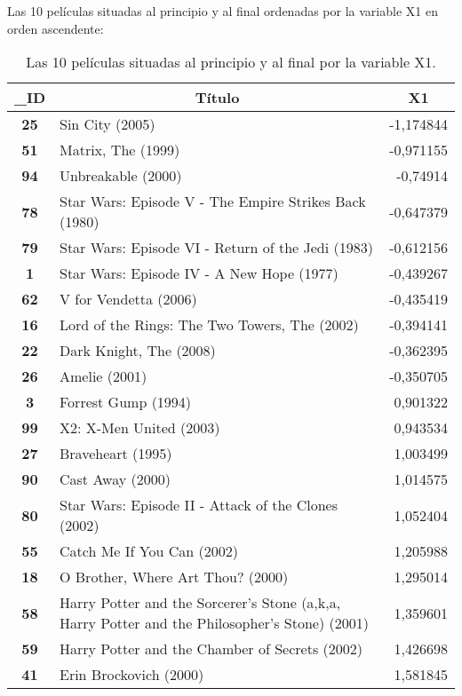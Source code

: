 \documentclass{uimppracticas}
\begin{document}
Las 10 películas situadas al principio y al final ordenadas por la variable X1 en orden ascendente:

\begin{table}[h]
	\centering
	\begin{tabular}{|c|l|r|}
		\hline
		\textbf{\_ID} & \multicolumn{1}{c|}{\textbf{Título}}                  & \multicolumn{1}{c|}{\textbf{X1}} \\ \hline
		\textbf{25} & Sin City (2005)         & -1,174844 \\ \hline
		\textbf{51} & Matrix, The (1999)      & -0,971155 \\ \hline
		\textbf{94} & Unbreakable (2000)      & -0,74914  \\ \hline
		\textbf{78}   & Star Wars: Episode V - The Empire Strikes Back (1980) & -0,647379                        \\ \hline
		\textbf{79}   & Star Wars: Episode VI - Return of the Jedi (1983)     & -0,612156                        \\ \hline
		\textbf{1}    & Star Wars: Episode IV - A New Hope (1977)             & -0,439267                        \\ \hline
		\textbf{62} & V for Vendetta (2006)   & -0,435419 \\ \hline
		\textbf{16}   & Lord of the Rings: The Two Towers, The (2002)         & -0,394141                        \\ \hline
		\textbf{22} & Dark Knight, The (2008) & -0,362395 \\ \hline
		\textbf{26} & Amelie (2001)           & -0,350705 \\ \hline
		\hline
		\textbf{3}  & Forrest Gump (1994)                                 & 0,901322 \\ \hline
		\textbf{99} & X2: X-Men United (2003)                             & 0,943534 \\ \hline
		\textbf{27} & Braveheart (1995)                                   & 1,003499 \\ \hline
		\textbf{90} & Cast Away (2000)                                    & 1,014575 \\ \hline
		\textbf{80} & Star Wars: Episode II - Attack of the Clones (2002) & 1,052404 \\ \hline
		\textbf{55} & Catch Me If You Can (2002)                          & 1,205988 \\ \hline
		\textbf{18} & O Brother, Where Art Thou? (2000)                   & 1,295014 \\ \hline
		\textbf{58}   & Harry Potter and the Sorcerer's Stone (a,k,a, Harry Potter and the   Philosopher's Stone) (2001) & 1,359601                         \\ \hline
		\textbf{59} & Harry Potter and the Chamber of Secrets (2002)      & 1,426698 \\ \hline
		\textbf{41} & Erin Brockovich (2000)                              & 1,581845 \\ \hline
	\end{tabular}
	\caption{Las 10 películas situadas al principio y al final por la variable X1.}
	\label{X1_principio}
\end{table}
\end{document}
